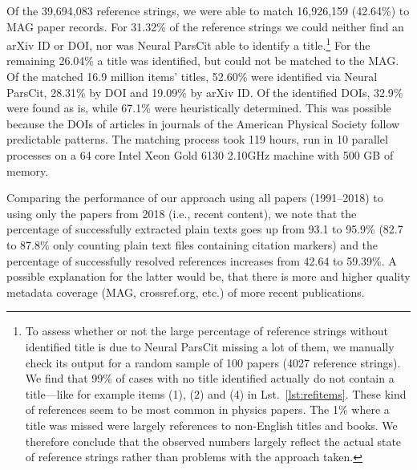 Of the 39,694,083 reference strings, we were able to match 16,926,159 (42.64\%) to MAG paper records. For 31.32\% of the reference strings we could neither find an arXiv ID or DOI, nor was Neural ParsCit able to identify a title.\footnote{To assess whether or not the large percentage of reference strings without identified title is due to Neural ParsCit missing a lot of them, we manually check its output for a random sample of 100 papers (4027 reference strings). We find that 99\% of cases with no title identified actually do not contain a title---like for example items (1), (2) and (4) in Lst.~\ref{lst:refitems}. These kind of references seem to be most common in physics papers. The 1\% where a title was missed were largely references to non-English titles and books. We therefore conclude that the observed numbers largely reflect the actual state of reference strings rather than problems with the approach taken.} For the remaining 26.04\% a title was identified, but could not be matched to the MAG.
Of the matched 16.9 million items' titles, 52.60\% were identified via Neural ParsCit, 28.31\% by DOI and 19.09\% by arXiv ID. Of the identified DOIs, 32.9\% were found as is, while 67.1\% were heuristically determined. This was possible because the DOIs of articles in journals of the American Physical Society follow predictable patterns. The matching process took 119 hours, run in 10 parallel processes on a 64 core Intel Xeon Gold 6130 2.10GHz machine with 500 GB of memory.

Comparing the performance of our approach using all papers (1991--2018) to using only the papers from 2018 (i.e., recent content), we note that the percentage of successfully extracted plain texts goes up from 93.1 to 95.9\% (82.7 to 87.8\% only counting plain text files containing citation markers) and the percentage of successfully resolved references increases from 42.64 to 59.39\%. A possible explanation for the latter would be, that there is more and higher quality metadata coverage (MAG, crossref.org, etc.) of more recent publications.

